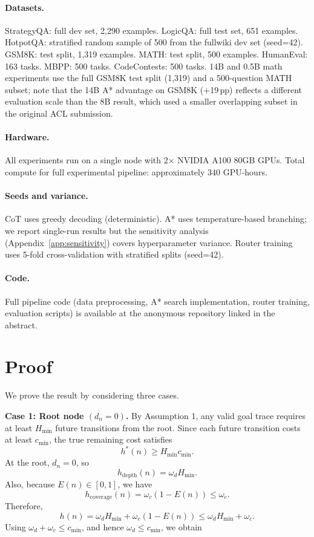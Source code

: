 \documentclass[11pt]{article}
\begin{document}
{\paragraph{Datasets.} StrategyQA: full dev set, 2{,}290 examples. LogicQA: full test set, 651 examples. HotpotQA: stratified random sample of 500 from the fullwiki dev set (seed=42). GSM8K: test split, 1{,}319 examples. MATH: test split, 500 examples. HumanEval: 163 tasks. MBPP: 500 tasks. CodeContests: 500 tasks. 14B and 0.5B math experiments use the full GSM8K test split (1{,}319) and a 500-question MATH subset; note that the 14B A* advantage on GSM8K (+19\,pp) reflects a different evaluation scale than the 8B result, which used a smaller overlapping subset in the original ACL submission.

\paragraph{Hardware.} All experiments run on a single node with 2$\times$ NVIDIA A100 80GB GPUs. Total compute for full experimental pipeline: approximately 340 GPU-hours.

\paragraph{Seeds and variance.} CoT uses greedy decoding (deterministic). A* uses temperature-based branching; we report single-run results but the sensitivity analysis (Appendix~\ref{app:sensitivity}) covers hyperparameter variance. Router training uses 5-fold cross-validation with stratified splits (seed=42).

\paragraph{Code.} Full pipeline code (data preprocessing, A* search implementation, router training, evaluation scripts) is available at the anonymous repository linked in the abstract.




\section{Proof}\label{full-proof}

We prove the result by considering three cases.

\textbf{Case 1: Root node \((d_n=0)\).}
By Assumption 1, any valid goal trace requires at least \(H_{\min}\) future transitions from the root. Since each future transition costs at least \(c_{\min}\), the true remaining cost satisfies
\[
h^*(n) \geq H_{\min}c_{\min}.
\]
At the root, \(d_n=0\), so
\[
h_{\mathrm{depth}}(n)=\omega_d H_{\min}.
\]
Also, because \(E(n)\in[0,1]\), we have
\[
h_{\mathrm{coverage}}(n)=\omega_c(1-E(n)) \leq \omega_c.
\]
Therefore,
\[
h(n) = \omega_d H_{\min} + \omega_c(1-E(n))
      \leq \omega_d H_{\min} + \omega_c.
\]
Using \(\omega_d+\omega_c \leq c_{\min}\), and hence \(\omega_d \leq c_{\min}\), we obtain


}
\end{document}

